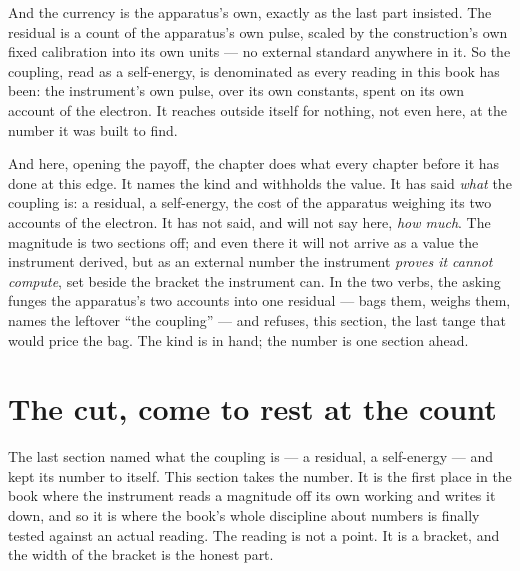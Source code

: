 And the currency is the apparatus's own, exactly as the last part insisted. The residual is a count of the apparatus's own
pulse, scaled by the construction's own fixed calibration into its own units --- no external standard anywhere in it. So the
coupling, read as a self-energy, is denominated as every reading in this book has been: the instrument's own pulse, over its
own constants, spent on its own account of the electron. It reaches outside itself for nothing, not even here, at the number
it was built to find.

And here, opening the payoff, the chapter does what every chapter before it has done at this edge. It names the kind and
withholds the value. It has said \emph{what} the coupling is: a residual, a self-energy, the cost of the apparatus weighing
its two accounts of the electron. It has not said, and will not say here, \emph{how much}. The magnitude is two sections off;
and even there it will not arrive as a value the instrument derived, but as an external number the instrument \emph{proves it
cannot compute}, set beside the bracket the instrument can. In the two verbs, the asking funges the apparatus's two accounts
into one residual --- bags them, weighs them, names the leftover ``the coupling'' --- and refuses, this section, the last
tange that would price the bag. The kind is in hand; the number is one section ahead.

\section{The cut, come to rest at the count}

The last section named what the coupling is --- a residual, a self-energy --- and kept its number to itself. This section
takes the number. It is the first place in the book where the instrument reads a magnitude off its own working and writes it
down, and so it is where the book's whole discipline about numbers is finally tested against an actual reading. The reading
is not a point. It is a bracket, and the width of the bracket is the honest part.

